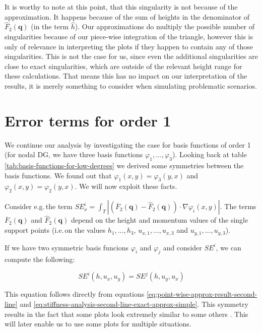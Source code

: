 \documentclass{article}
\renewcommand{\phi}{\varphi}
\begin{document}
It is worthy to note at this point, that this singularity is not because of the approximation. It happens because of the sum of heights in the denominator of $\widehat{F}_2\left(\mathbf{q}\right)$ (in the term $\widehat{h}$). Our approximations do multiply the possible number of singularities because of our piece-wise integration of the triangle, however this is only of relevance in interpreting the plots if they happen to contain any of those singularities. This is not the case for us, since even the additional singularities are close to exact singularities, which are outside of the relevant height range for these calculations. That means this has no impact on our interpretation of the results, it is merely something to consider when simulating problematic scenarios.

\section{Error terms for order 1}
\label{sec:stiffness-analysis-first-touch}

We continue our analysis by investigating the case for basis functions of order 1 (for nodal DG, we have three basis functions $\phi_1,\dots,\phi_3$). Looking back at table \ref{tab:basis-functions-for-low-degrees} we derived some symmetries between the basis functions. We found out that $\phi_1(x,y)=\phi_3(y,x)$ and $\phi_2(x,y)=\phi_2(y,x)$. We will now exploit these facts.

Consider e.g.\,the term $SE_x^i = \int_T \left| \left(\overline{F}_2(\mathbf{q})-\widehat{F}_2(\mathbf{q})\right) \cdot \nabla\phi_i(x,y) \right|$. The terms $\overline{F}_2(\mathbf{q})$ and $\widehat{F}_2(\mathbf{q})$ depend on the height and momentum values of the single support points (i.e.\,on the values $h_1,\dots,h_3$, $u_{x,1},\dots,u_{x,3}$ and $u_{y,1},\dots,u_{y,3}$).

If we have two symmetric basis funcions $\phi_i$ and $\phi_j$ and consider $SE^i$, we can compute the following:

\begin{equation*}
  SE^i(h, u_x, u_y) = SE^j(h, u_y, u_x)
\end{equation*}

This equation follows directly from equations \eqref{eq:point-wise-approx-result-second-line} and \eqref{eq:stiffness-analysis-second-line-exact-approx-simple}. This symmetry results in the fact that some plots look extremely similar to some others
. This will later enable us to use some plots for multiple situations.
\end{document}
